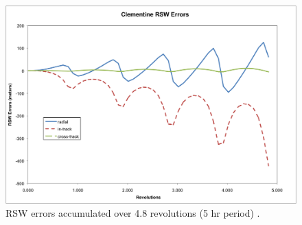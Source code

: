 \begin{description}
\begin{figure}
\begin{center}
\includegraphics [width=7.0in]{figs/clem/clem_err.png}
\end{center}
\caption{RSW errors accumulated over 4.8 revolutions (5 hr period) .}
\label{fig:6}
\end{figure}

\end{description}
\clearpage
\newpage

